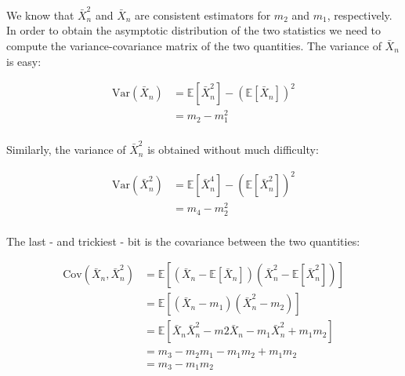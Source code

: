 \documentclass{report}
\begin{document}
We know that $\bar{X}^2_n$ and $\bar{X}_n$ are consistent estimators for $m_2$ and $m_1$, respectively. In order to obtain the asymptotic distribution of the two statistics we need to compute the variance-covariance matrix of the two quantities. The variance of $\bar{X}_n$ is easy:

\begin{equation}\label{eq:ex-lst-clt-proof-2}
\begin{aligned}
    \text{Var}\left(\bar{X}_n\right)
      &= \mathbb{E}\left[\bar{X}_n^2\right] - \left(\mathbb{E}\left[\bar{X}_n\right]\right)^2 \\
      &= m_2 - m_1^2 \\
\end{aligned}
\end{equation}

Similarly, the variance of $\bar{X}_n^2$ is obtained without much difficulty:

\begin{equation}\label{eq:ex-lst-clt-proof-3}
    \begin{aligned}
        \text{Var}\left(\bar{X}_n^2\right)
          &= \mathbb{E}\left[\bar{X}_n^4\right] - \left(\mathbb{E}\left[\bar{X}_n^2\right]\right)^2 \\
          &= m_4 - m_2^2 \\
    \end{aligned}
\end{equation}

The last - and trickiest - bit is the covariance between the two quantities:

\begin{equation}\label{eq:ex-lst-clt-proof-4}
    \begin{aligned}
        \text{Cov}\left(\bar{X}_n, \bar{X}_n^2\right)
          &= \mathbb{E}\left[\left(\bar{X}_n - \mathbb{E}\left[\bar{X}_n\right]\right)\left(\bar{X}_n^2 - \mathbb{E}\left[\bar{X}_n^2\right]\right)\right] \\
          &= \mathbb{E}\left[\left(\bar{X}_n - m_1\right)\left(\bar{X}_n^2 - m_2\right)\right] \\
          &= \mathbb{E}\left[\bar{X}_n\bar{X}_n^2 - m2\bar{X}_n - m_1\bar{X}_n^2 + m_1m_2\right] \\
          &= m_3 - m_2m_1 - m_1m_2 + m_1m_2 \\
          &= m_3 - m_1m_2 \\
    \end{aligned}
\end{equation}
\end{document}
